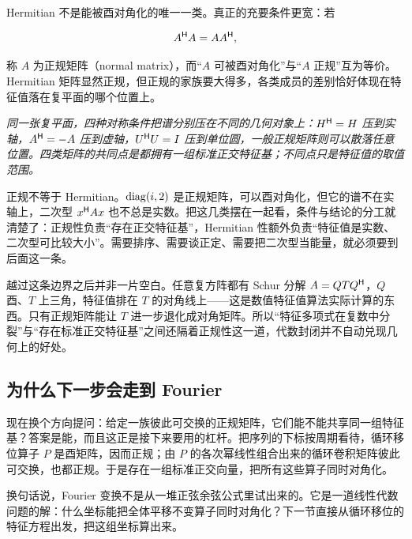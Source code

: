 Hermitian 不是能被酉对角化的唯一一类。真正的充要条件更宽：若

\[
A^{\mathsf{H}}A=AA^{\mathsf{H}},
\]

称 \(A\) 为正规矩阵（normal matrix），而``\(A\) 可被酉对角化''与``\(A\) 正规''互为等价。Hermitian 矩阵显然正规，但正规的家族要大得多，各类成员的差别恰好体现在特征值落在复平面的哪个位置上。

\begin{center}

\emph{同一张复平面，四种对称条件把谱分别压在不同的几何对象上：\(H^{\mathsf{H}}=H\) 压到实轴，\(A^{\mathsf{H}}=-A\) 压到虚轴，\(U^{\mathsf{H}}U=I\) 压到单位圆，一般正规矩阵则可以散落任意位置。四类矩阵的共同点是都拥有一组标准正交特征基；不同点只是特征值的取值范围。}
\end{center}

正规不等于 Hermitian。\(\operatorname{diag}(i,2)\) 是正规矩阵，可以酉对角化，但它的谱不在实轴上，二次型 \(x^{\mathsf{H}}Ax\) 也不总是实数。把这几类摆在一起看，条件与结论的分工就清楚了：正规性负责``存在正交特征基''，Hermitian 性额外负责``特征值是实数、二次型可比较大小''。需要排序、需要谈正定、需要把二次型当能量，就必须要到后面这一条。

越过这条边界之后并非一片空白。任意复方阵都有 Schur 分解 \(A=QTQ^{\mathsf{H}}\)，\(Q\) 酉、\(T\) 上三角，特征值排在 \(T\) 的对角线上——这是数值特征值算法实际计算的东西。只有正规矩阵能让 \(T\) 进一步退化成对角矩阵。所以``特征多项式在复数中分裂''与``存在标准正交特征基''之间还隔着正规性这一道，代数封闭并不自动兑现几何上的好处。

\subsection{为什么下一步会走到 Fourier}

现在换个方向提问：给定一族彼此可交换的正规矩阵，它们能不能共享同一组特征基？答案是能，而且这正是接下来要用的杠杆。把序列的下标按周期看待，循环移位算子 \(P\) 是酉矩阵，因而正规；由 \(P\) 的各次幂线性组合出来的循环卷积矩阵彼此可交换，也都正规。于是存在一组标准正交向量，把所有这些算子同时对角化。

换句话说，Fourier 变换不是从一堆正弦余弦公式里试出来的。它是一道线性代数问题的解：什么坐标能把全体平移不变算子同时对角化？下一节直接从循环移位的特征方程出发，把这组坐标算出来。
